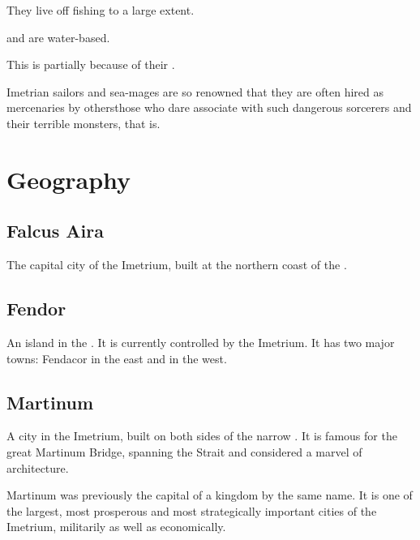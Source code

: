 They live off fishing to a large extent. 

 and  are water-based. 

This is partially because of their . 

Imetrian sailors and sea-mages are so renowned that they are often hired as mercenaries by others\dash{}those who dare associate with such dangerous sorcerers and their terrible monsters, that is.








\section{Geography}





\subsection{Falcus Aira}
The capital city of the Imetrium, built at the northern coast of the . 





\subsection{Fendor}
An island in the . 
It is currently controlled by the Imetrium. It has two major towns: Fendacor in the east and \Cicora{} in the west.





\subsection{Martinum}
A city in the Imetrium, built on both sides of the narrow . 
It is famous for the great Martinum Bridge, spanning the Strait and considered a marvel of architecture. 

Martinum was previously the capital of a kingdom by the same name. It is one of the largest, most prosperous and most strategically important cities of the Imetrium, militarily as well as economically. 

